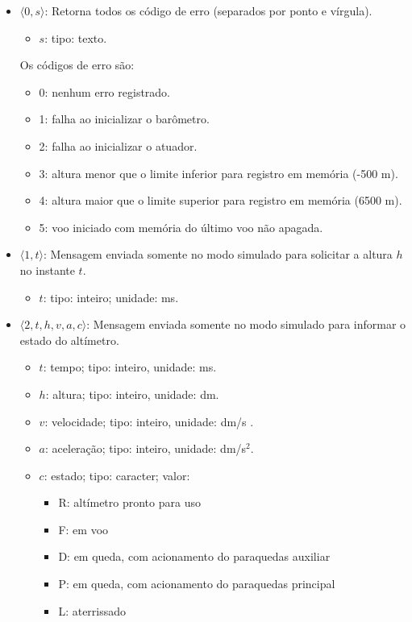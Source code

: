 \documentclass[portuguese,10pt,a4paper]{article}
\begin{document}
\begin{itemize}
	\item $\langle 0, s\rangle$: Retorna todos os código de erro (separados por ponto e vírgula).
	  \begin{itemize}
	  	\item $s$: tipo: texto.  
	  \end{itemize}
  Os códigos de erro são:
	\begin{itemize}
		\item 0: nenhum erro registrado.
		\item 1: falha ao inicializar o barômetro.
		\item 2: falha ao inicializar o atuador.
		\item 3: altura menor que o limite inferior para registro em memória (-500 m).
		\item 4: altura maior que o limite superior para registro em memória (6500 m).
		\item 5: voo iniciado com memória do último voo não apagada.
	\end{itemize}
	\item $\langle 1, t\rangle$: Mensagem enviada somente no modo simulado para solicitar a altura $h$ no instante $t$.
	\begin{itemize}
		\item $t$: tipo: inteiro; unidade: ms.  
	\end{itemize}
	\item $\langle 2, t, h, v, a, c\rangle$: Mensagem enviada somente no modo simulado para informar o estado do altímetro.
	\begin{itemize}
		\item $t$: tempo; tipo: inteiro, unidade: ms.
		\item $h$: altura; tipo: inteiro, unidade: dm.
		\item $v$: velocidade; tipo: inteiro, unidade: dm/s .
		\item $a$: aceleração; tipo: inteiro, unidade: dm/s$^2$.
		\item $c$: estado; tipo: caracter; valor:
		\begin{itemize}
			\item R: altímetro pronto para uso
			\item F: em voo
			\item D: em queda, com acionamento do paraquedas auxiliar
			\item P: em queda, com acionamento do paraquedas principal
			\item L: aterrissado
		\end{itemize} 

\end{itemize}
\end{itemize}
\end{document}
